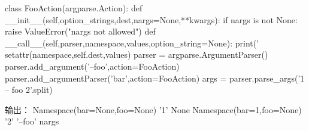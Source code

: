 \begin{itemize}
\begin{python}
class FooAction(argparse.Action):
    def __init__(self,option_strings,dest,nargs=None,**kwargs):
        if nargs is not None:
            raise ValueError("nargs not allowed")
    def __call__(self,parser,namespace,values,option_string=None):
        print('%
        setattr(namespace,self.dest,values)
parser = argparse.ArgumentParser()
parser.add_argument('--foo',action=FooAction)
parser.add_argumentParser('bar',action=FooAction)
args = parser.parse_args('1 -- foo 2'.split)
\end{python}
\end{itemize}
输出：\newline
Namespace(bar=None,foo=None) '1' None\newline
Namespace(bar=1,foo=None) '2' '--foo' \newline
nargs\newline
